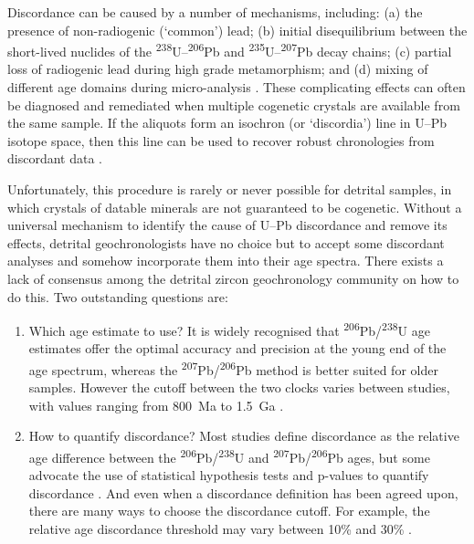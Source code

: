 \documentclass{article}
\begin{document}
Discordance can be caused by a number of mechanisms, including: (a)
the presence of non-radiogenic (`common') lead; (b) initial
disequilibrium between the short-lived nuclides of the
\textsuperscript{238}U--\textsuperscript{206}Pb and
\textsuperscript{235}U--\textsuperscript{207}Pb decay chains; (c)
partial loss of radiogenic lead during high grade metamorphism; and
(d) mixing of different age domains during micro-analysis
\citep{schoene2014}. These complicating effects can often be diagnosed
and remediated when multiple cogenetic crystals are available from the
same sample. If the aliquots form an isochron (or `discordia') line in
U--Pb isotope space, then this line can be used to recover robust
chronologies from discordant data \citep{ludwig1998}.

Unfortunately, this procedure is rarely or never possible for detrital
samples, in which crystals of datable minerals are not guaranteed to
be cogenetic.  Without a universal mechanism to identify the cause of
U--Pb discordance and remove its effects, detrital geochronologists
have no choice but to accept some discordant analyses and somehow
incorporate them into their age spectra.  There exists a lack of
consensus among the detrital zircon geochronology community on how to
do this.  Two outstanding questions are:

\begin{enumerate}
\item Which age estimate to use? It is widely recognised that
  \textsuperscript{206}Pb/\textsuperscript{238}U age estimates offer
  the optimal accuracy and precision at the young end of the age
  spectrum, whereas the
  \textsuperscript{207}Pb/\textsuperscript{206}Pb method is better
  suited for older samples. However the cutoff between the two clocks
  varies between studies, with values ranging from 800~Ma to 1.5~Ga
  \citep{gehrels2011,spencer2016}.
\item How to quantify discordance?  Most studies define discordance as
  the relative age difference between the
  \textsuperscript{206}Pb/\textsuperscript{238}U and
  \textsuperscript{207}Pb/\textsuperscript{206}Pb ages, but some
  advocate the use of statistical hypothesis tests and p-values to
  quantify discordance \citep{spencer2016}. And even when a
  discordance definition has been agreed upon, there are many ways to
  choose the discordance cutoff. For example, the relative age
  discordance threshold may vary between 10\% and 30\%
  \citep{gehrels2011}.
\end{enumerate}
\end{document}
